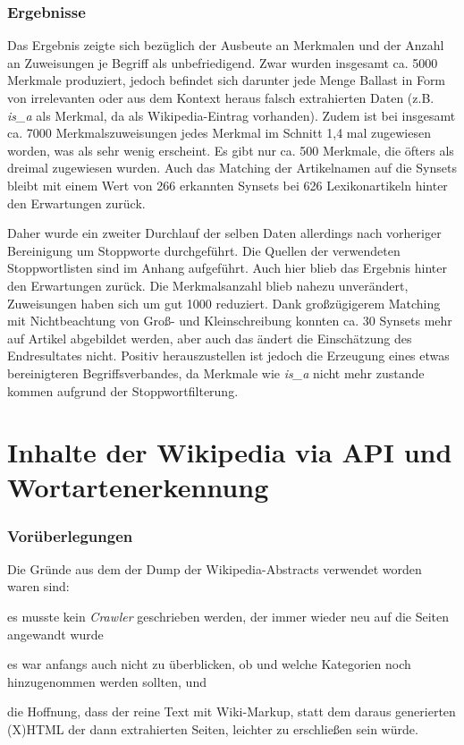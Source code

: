 \documentclass[pagesize,DIV=calc,12pt,draft]{scrreprt}
\begin{document}
\subsubsection{Ergebnisse}

Das Ergebnis zeigte sich bezüglich der Ausbeute an Merkmalen und der Anzahl an Zuweisungen je Begriff als unbefriedigend. 
Zwar wurden insgesamt ca. 5000 Merkmale produziert, jedoch befindet sich darunter jede Menge Ballast in Form von irrelevanten oder aus dem Kontext heraus falsch extrahierten Daten (z.B. \emph{is\_a} als Merkmal, da als Wikipedia-Eintrag vorhanden). 
Zudem ist bei insgesamt ca. 7000 Merkmalszuweisungen jedes Merkmal im Schnitt 1,4 mal zugewiesen worden, was als sehr wenig erscheint. 
Es gibt nur ca. 500 Merkmale, die öfters als dreimal zugewiesen wurden. 
Auch das Matching der Artikelnamen auf die Synsets bleibt mit einem Wert von 266 erkannten Synsets bei 626 Lexikonartikeln hinter den Erwartungen zurück. 

Daher wurde ein zweiter Durchlauf der selben Daten allerdings nach vorheriger Bereinigung um Stoppworte durchgeführt. 
Die Quellen der verwendeten Stoppwortlisten sind im Anhang aufgeführt. 
Auch hier blieb das Ergebnis hinter den Erwartungen zurück. 
Die Merkmalsanzahl blieb nahezu unverändert, Zuweisungen haben sich um gut 1000 reduziert. 
Dank großzügigerem Matching mit Nichtbeachtung von Groß- und Kleinschreibung konnten ca. 30 Synsets mehr auf Artikel abgebildet werden, aber auch das ändert die Einschätzung des Endresultates nicht. 
Positiv herauszustellen ist jedoch die Erzeugung eines etwas bereinigteren Begriffsverbandes, da Merkmale wie \emph{is\_a} nicht mehr zustande kommen aufgrund der Stoppwortfilterung. 
\section{Inhalte der Wikipedia via API und Wortartenerkennung}

\subsubsection{Vorüberlegungen}

Die Gründe aus dem der Dump der Wikipedia-Abstracts verwendet worden waren sind: 
\begin{inparaenum}
\item es musste kein \emph{Crawler} geschrieben werden, der immer wieder neu auf die Seiten angewandt wurde
\item es war anfangs auch nicht zu überblicken, ob und welche Kategorien noch hinzugenommen werden sollten, und 
\item die Hoffnung, dass der reine Text mit Wiki-Markup, statt dem daraus generierten (X)HTML der dann extrahierten Seiten, leichter zu erschließen sein würde.
\end{inparaenum}
\end{document}
